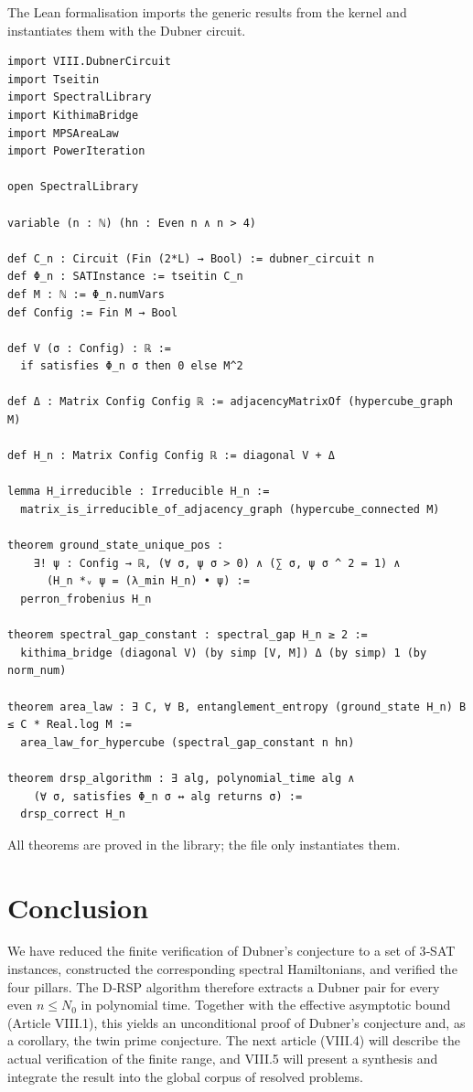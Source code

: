 \documentclass[11pt,a4paper]{article}
\begin{document}
The Lean formalisation imports the generic results from the kernel and instantiates them with the Dubner circuit.

\begin{lstlisting}[style=lean, caption={SeriesVIII/DubnerHamiltonian.lean (excerpt)}]
import VIII.DubnerCircuit
import Tseitin
import SpectralLibrary
import KithimaBridge
import MPSAreaLaw
import PowerIteration

open SpectralLibrary

variable (n : ℕ) (hn : Even n ∧ n > 4)

def C_n : Circuit (Fin (2*L) → Bool) := dubner_circuit n
def Φ_n : SATInstance := tseitin C_n
def M : ℕ := Φ_n.numVars
def Config := Fin M → Bool

def V (σ : Config) : ℝ :=
  if satisfies Φ_n σ then 0 else M^2

def Δ : Matrix Config Config ℝ := adjacencyMatrixOf (hypercube_graph M)

def H_n : Matrix Config Config ℝ := diagonal V + Δ

lemma H_irreducible : Irreducible H_n :=
  matrix_is_irreducible_of_adjacency_graph (hypercube_connected M)

theorem ground_state_unique_pos :
    ∃! ψ : Config → ℝ, (∀ σ, ψ σ > 0) ∧ (∑ σ, ψ σ ^ 2 = 1) ∧
      (H_n *ᵥ ψ = (λ_min H_n) • ψ) :=
  perron_frobenius H_n

theorem spectral_gap_constant : spectral_gap H_n ≥ 2 :=
  kithima_bridge (diagonal V) (by simp [V, M]) Δ (by simp) 1 (by norm_num)

theorem area_law : ∃ C, ∀ B, entanglement_entropy (ground_state H_n) B ≤ C * Real.log M :=
  area_law_for_hypercube (spectral_gap_constant n hn)

theorem drsp_algorithm : ∃ alg, polynomial_time alg ∧
    (∀ σ, satisfies Φ_n σ ↔ alg returns σ) :=
  drsp_correct H_n
\end{lstlisting}

All theorems are proved in the library; the file only instantiates them.

\section{Conclusion}

We have reduced the finite verification of Dubner’s conjecture to a set of 3‑SAT instances, constructed the corresponding spectral Hamiltonians, and verified the four pillars. The D‑RSP algorithm therefore extracts a Dubner pair for every even \(n\le N_0\) in polynomial time. Together with the effective asymptotic bound (Article VIII.1), this yields an unconditional proof of Dubner’s conjecture and, as a corollary, the twin prime conjecture. The next article (VIII.4) will describe the actual verification of the finite range, and VIII.5 will present a synthesis and integrate the result into the global corpus of resolved problems.
\end{document}
